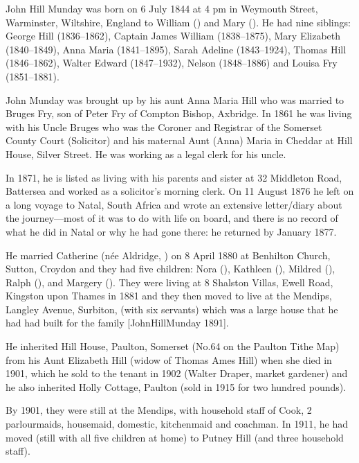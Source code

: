 
John Hill Munday was born on 6 July 1844 at 4 pm in Weymouth Street, Warminster, Wiltshire, England\cite{JHMtree, Census1861, JMHbirth} to William () and Mary (). He had nine siblings: George Hill (1836--1862), Captain James William (1838--1875), Mary Elizabeth (1840--1849), Anna Maria (1841--1895), Sarah Adeline (1843--1924), Thomas Hill (1846--1862), Walter Edward (1847--1932), Nelson (1848--1886) and Louisa Fry (1851--1881).

John Munday was brought up by his aunt Anna Maria Hill who was married to Bruges Fry, son of Peter Fry of Compton Bishop, Axbridge. In 1861 he was living with his Uncle Bruges who was the Coroner and Registrar of the Somerset County Court (Solicitor) and his maternal Aunt (Anna) Maria  in Cheddar at  Hill House, Silver Street. He was working as a legal clerk for his uncle.\cite{Census1861}

In 1871, he is listed as living with his parents and sister at 32 Middleton Road, Battersea and worked as a solicitor's morning clerk.\cite{JohnHillMunday1871} On 11 August 1876 he left on a long voyage to Natal, South Africa and wrote an extensive letter/diary about the journey---most of it was to do with life on board, and there is no record of what he did in Natal or why he had gone there: he returned by January 1877.

He married Catherine (n\'{e}e Aldridge, ) on 8 April 1880 at Benhilton Church, Sutton, Croydon\cite{JHM-CA-marriage-announcement, JHMtree} and they had five children: Nora (), Kathleen (), Mildred (), Ralph (), and Margery ().  They were living at 8 Shalston Villas, Ewell Road, Kingston upon Thames in 1881\cite{JohnHillMunday1881} and they then moved to live at the Mendips, Langley Avenue, Surbiton, (with six servants)  which was  a large house that he had had  built for the family [JohnHillMunday 1891].

He inherited Hill House, Paulton, Somerset (No.64 on the Paulton Tithe Map) from his Aunt Elizabeth Hill (widow of Thomas Ames Hill) when she died in 1901, which he sold to the tenant in 1902 (Walter Draper, market gardener) and he also inherited Holly Cottage, Paulton (sold in 1915 for two hundred pounds).

By 1901, they were still at the Mendips, with household staff of Cook, 2 parlourmaids, housemaid, domestic, kitchenmaid and coachman. In 1911, he had moved (still with all five children at home) to Putney Hill (and three household staff).\cite{JohnHillMunday1911}


